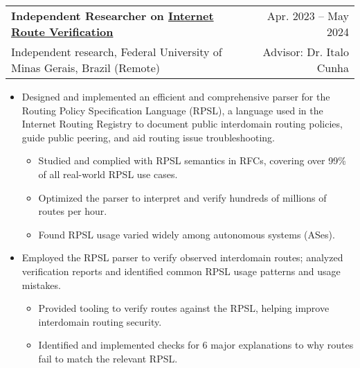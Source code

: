 \documentclass[letterpaper,11pt]{article}
\makeatletter
\newcommand{\CVItem}[1]{
  \item{\small
    {#1 \vspace{-2pt}}
  }
}
\newcommand{\CVSubheadingFrame}[1]{
  \vspace{-2pt}\item
    \begin{tabular*}{0.97\textwidth}[t]{l@{\extracolsep{\fill}}r}
        #1
    \end{tabular*}\vspace{-7pt}
}
\newcommand{\CVSubheading}[4]{\CVSubheadingFrame
    {\textbf{#1} & #2 \\
        \small#3 & #4 \\
    }}
\newcommand{\CVItemListStart}{\begin{itemize}}
\newcommand{\CVItemListEnd}{\end{itemize}\vspace{-5pt}}
\newcommand{\uhref}[2]{\href{#1}{\textcolor{darkbluepurple}{#2}}}
\makeatother
\begin{document}
\CVSubheading
{Independent Researcher on \uhref
    {https://github.com/SichangHe/internet_route_verification}
    {Internet Route Verification}
}{Apr. 2023 -- May 2024}
{Independent research, Federal University of Minas Gerais, Brazil (Remote)}
{Advisor: Dr. Italo Cunha}
\CVItemListStart
\CVItem
{Designed and implemented an efficient and comprehensive parser for
    the Routing Policy Specification Language (RPSL),
    a language used in the Internet Routing Registry to
    document public interdomain routing policies,
    guide public peering, and aid routing issue troubleshooting.
    \begin{itemize}
        \item Studied and complied with RPSL semantics in RFCs,
        covering over 99\% of all real-world RPSL use cases.
        \item Optimized the parser to interpret and verify hundreds of
        millions of routes per hour.
        \item Found RPSL usage varied widely among autonomous systems (ASes).
    \end{itemize}
}
\CVItem
{Employed the RPSL parser to verify observed interdomain routes;
    analyzed verification reports and identified common RPSL usage patterns and
    usage mistakes.
    \begin{itemize}
        \item Provided tooling to verify routes against the RPSL,
        helping improve interdomain routing security.
        \item Identified and implemented checks for 6 major explanations to
        why routes fail to match the relevant RPSL.
    \end{itemize}
}
\CVItemListEnd
\end{document}
